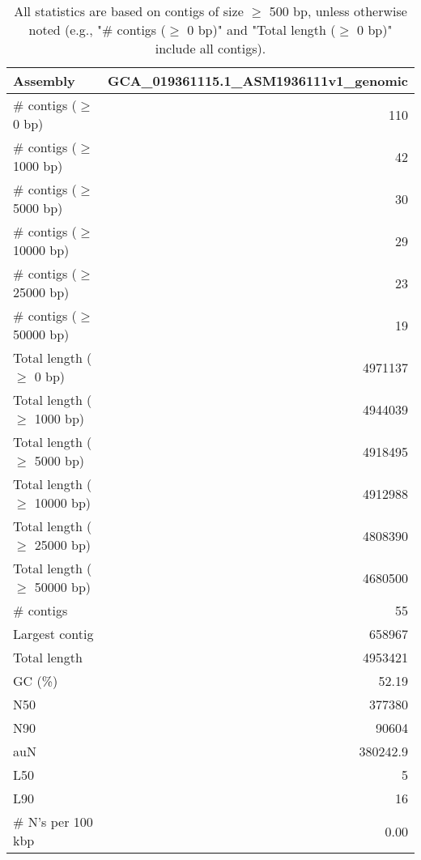 \documentclass[12pt,a4paper]{article}
\begin{document}
\begin{table}[ht]
\begin{center}
\caption{All statistics are based on contigs of size $\geq$ 500 bp, unless otherwise noted (e.g., "\# contigs ($\geq$ 0 bp)" and "Total length ($\geq$ 0 bp)" include all contigs).}
\begin{tabular}{|l*{1}{|r}|}
\hline
Assembly & GCA\_019361115.1\_ASM1936111v1\_genomic \\ \hline
\# contigs ($\geq$ 0 bp) & 110 \\ \hline
\# contigs ($\geq$ 1000 bp) & 42 \\ \hline
\# contigs ($\geq$ 5000 bp) & 30 \\ \hline
\# contigs ($\geq$ 10000 bp) & 29 \\ \hline
\# contigs ($\geq$ 25000 bp) & 23 \\ \hline
\# contigs ($\geq$ 50000 bp) & 19 \\ \hline
Total length ($\geq$ 0 bp) & 4971137 \\ \hline
Total length ($\geq$ 1000 bp) & 4944039 \\ \hline
Total length ($\geq$ 5000 bp) & 4918495 \\ \hline
Total length ($\geq$ 10000 bp) & 4912988 \\ \hline
Total length ($\geq$ 25000 bp) & 4808390 \\ \hline
Total length ($\geq$ 50000 bp) & 4680500 \\ \hline
\# contigs & 55 \\ \hline
Largest contig & 658967 \\ \hline
Total length & 4953421 \\ \hline
GC (\%) & 52.19 \\ \hline
N50 & 377380 \\ \hline
N90 & 90604 \\ \hline
auN & 380242.9 \\ \hline
L50 & 5 \\ \hline
L90 & 16 \\ \hline
\# N's per 100 kbp & 0.00 \\ \hline
\end{tabular}
\end{center}
\end{table}
\end{document}
